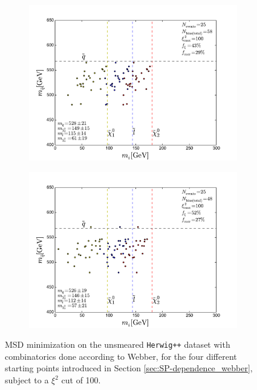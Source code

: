\documentclass[twoside,english]{uiofysmaster}
\begin{document}
\begin{figure}[hbt]
	\begin{subfigure}[b]{0.45\textwidth}
		\includegraphics[width=\textwidth]{figures/improving_combinatorics/herwigpp-MD-dileptonedge-fit-comb-nosmear-cut100_800-500-300-50.pdf} 
		\caption{ }
	\end{subfigure}
	\begin{subfigure}[b]{0.45\textwidth}
		\includegraphics[width=\textwidth]{figures/improving_combinatorics/herwigpp-MD-dileptonedge-fit-comb-nosmear-cut100_1000-100-80-30.pdf}
		\caption{ } 
	\end{subfigure}
	\caption{MSD minimization on the unsmeared {\tt Herwig++} dataset with combinatorics done according to Webber, for the four different starting points introduced in Section \ref{sec:SP-dependence_webber}, subject to a $\xi^2$ cut of 100.}
	\label{fig:MD_starting_point_sensitivity_combinatorics_cut}
\end{figure}
\end{document}
